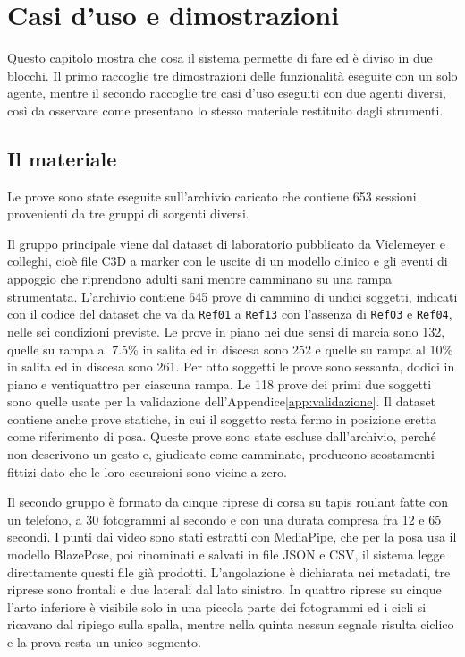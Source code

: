 \chapter{Casi d'uso e dimostrazioni}
\label{chap:casi-uso}

Questo capitolo mostra che cosa il sistema permette di fare ed è diviso in due
blocchi. Il primo raccoglie tre dimostrazioni delle funzionalità eseguite con un
solo agente, mentre il secondo raccoglie tre casi d'uso eseguiti con due agenti
diversi, così da osservare come presentano lo stesso materiale
restituito dagli strumenti.

\section{Il materiale}
\label{sec:ch4:materiale}

Le prove sono state eseguite sull'archivio caricato che contiene 653 sessioni
provenienti da tre gruppi di sorgenti diversi.

Il gruppo principale viene dal dataset di laboratorio pubblicato da Vielemeyer e
colleghi\cite{vielemeyer2026}, cioè file C3D a marker con le uscite di un modello
clinico e gli eventi di appoggio che riprendono adulti sani mentre camminano su
una rampa strumentata. L'archivio contiene 645 prove di cammino di undici
soggetti, indicati con il codice del dataset che va da \texttt{Ref01} a
\texttt{Ref13} con l'assenza di \texttt{Ref03} e \texttt{Ref04}, nelle sei condizioni
previste. Le prove in piano nei due sensi di marcia sono 132, quelle su rampa al
7.5\% in salita ed in discesa sono 252 e quelle su rampa al 10\% in salita ed in
discesa sono 261. Per otto soggetti le prove sono sessanta, dodici in piano e
ventiquattro per ciascuna rampa. Le
118 prove dei primi due soggetti sono quelle usate per la validazione
dell'Appendice\ref{app:validazione}.
Il dataset contiene anche prove statiche, in cui il soggetto resta fermo in
posizione eretta come riferimento di posa. Queste prove sono state escluse
dall'archivio, perché non descrivono un gesto e, giudicate come camminate,
producono scostamenti fittizi dato che le loro escursioni sono vicine a zero.

Il secondo gruppo è formato da cinque riprese di corsa su tapis roulant fatte con
un telefono, a 30 fotogrammi al secondo e con una durata compresa fra 12 e 65
secondi. I punti dai video sono stati estratti con
MediaPipe\cite{lugaresi2019mediapipe}, che per la posa usa il modello
BlazePose\cite{bazarevsky2020blazepose}, poi rinominati e salvati in file
JSON e CSV, il sistema legge direttamente questi file già prodotti.
L'angolazione è dichiarata nei metadati, tre riprese sono frontali e due laterali
dal lato sinistro. In quattro riprese su cinque l'arto inferiore è visibile solo
in una piccola parte dei fotogrammi ed i cicli si ricavano dal ripiego sulla
spalla, mentre nella quinta nessun segnale risulta ciclico e la prova resta un
unico segmento.

